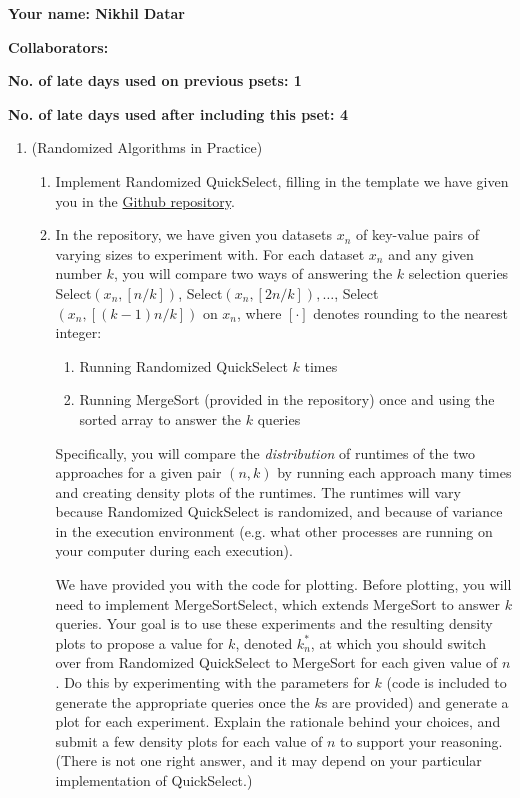 \documentclass[11pt]{article}
\begin{document}

\textbf{Your name: Nikhil Datar}

\textbf{Collaborators: }

\textbf{No. of late days used on previous psets: 1}

\textbf{No. of late days used after including this pset: 4}

\begin{enumerate}
    \item (Randomized Algorithms in Practice)  
    \begin{enumerate}
        \item Implement Randomized QuickSelect, filling in the template we have given you in the \href{https://github.com/Harvard-CS-120/cs120/tree/main/fall2022/psets}{Github repository}.  
        
        \item 
        In the repository, we have given you datasets $x_n$ of key-value pairs of varying sizes to experiment with.  For each dataset $x_n$ and any given number $k$, you will compare two ways of answering the $k$ selection queries
        Select$(x_n,[n/k])$, Select$(x_n,[2n/k]), \ldots$, Select$(x_n,[(k-1)n/k])$ on $x_n$, where $[\cdot]$ denotes rounding to the nearest integer:
        \begin{enumerate}
            \item Running Randomized QuickSelect $k$ times
            \item Running MergeSort (provided in the repository) once and using the sorted array to answer the $k$ queries
        \end{enumerate}
        Specifically, you will compare the {\em distribution} of runtimes of the two approaches for a given pair $(n,k)$ by running each approach many times and creating density plots of the runtimes.  The runtimes will vary because Randomized QuickSelect  is randomized, and because of variance in the execution environment (e.g. what other processes are running on your computer during each execution).
        
        We have provided you with the code for plotting. Before plotting, you will need to implement MergeSortSelect, which extends MergeSort to answer $k$ queries. Your goal is to use these experiments and the resulting density plots to propose a value for $k$, denoted $k^*_n$, at which you should switch over from Randomized QuickSelect to MergeSort for each given value of $n$. Do this by experimenting with the parameters for $k$ (code is included to generate the appropriate queries once the $k$s are provided) and generate a plot for each experiment.  Explain the rationale behind your choices, and submit a few density plots for each value of $n$ to support your reasoning.  (There is not one right answer, and it may depend on your particular implementation of QuickSelect.) \\
        

\end{enumerate}
\end{enumerate}
\end{document}
